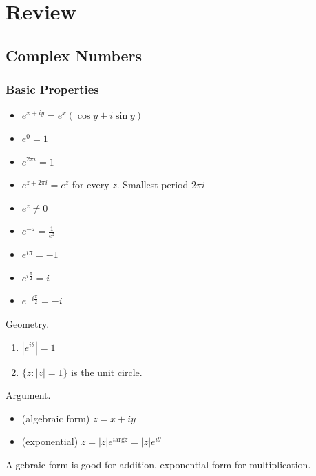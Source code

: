 
\section{Review}
\subsection{Complex Numbers}
\subsubsection{Basic Properties}
\begin{itemize}
	\item $e^{x+iy } = e^x \left( \cos y + i \sin y \right)$ 
	\item $e^0 = 1$
	\item $e^{2\pi i} = 1$
	\item $e^{z + 2\pi i} = e^z$ for every $z$. Smallest period $2 \pi i$
	\item $e^z \neq  0$
	\item $e^{-z } = \frac{1}{e^z}$
	\item $e^{i \pi} = -1$
	\item $e^{i \frac{\pi}{2}} = i$
	\item $e^{-i\frac{\pi}{2}} = -i$
	
\end{itemize}

Geometry.
\begin{enumerate}
	\item $|e^{i \theta}| = 1$
\item  $\{z: |z| = 1\} $ is the unit circle.
\end{enumerate}

Argument.
\begin{itemize}
	\item (algebraic form) $z = x+iy$
	\item (exponential) $z = |z| e^{i \text{arg} z} = |z| e^{i \theta}$
\end{itemize}

Algebraic form is good for addition, exponential form for multiplication.

